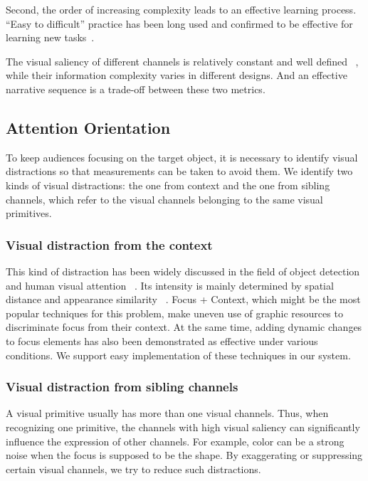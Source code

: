 Second, the order of increasing complexity leads to an effective learning process. “Easy to difficult” practice has been long used and confirmed to be effective for learning new tasks~\cite{bliss_effects_1992}.
 
The visual saliency of different channels is relatively constant and  well defined ~\cite{munzner_visualization_2014,cleveland_graphical_1984}, while their information complexity varies in different designs. And an effective narrative sequence is a trade-off between these two metrics. 


\subsection{Attention Orientation}
To keep audiences focusing on the target object, it is necessary to identify visual distractions so that measurements can be taken to avoid them. 
We identify two kinds of visual distractions: the one from context and the one from sibling channels, which refer to the visual channels belonging to the same visual primitives. 

\subsubsection{Visual distraction from the context}
This kind of distraction has been widely discussed in the field of object detection and human visual attention ~\cite{nothdurft_salience_2000, standage_modelling_2005}. Its intensity is mainly  determined by spatial distance and appearance similarity ~\cite{wolfe_guided_1994}. 
Focus + Context, which might be the most popular techniques for this problem, make uneven use of graphic resources to discriminate focus from their context. At the same time, adding dynamic changes to focus elements has also been demonstrated as effective under various conditions\cite{waldner_attractive_2014}. We support easy implementation of these techniques in our system. 

\subsubsection{Visual distraction from sibling channels}
A visual primitive usually has more than one visual channels. Thus, when recognizing one primitive, the channels with high visual saliency can significantly influence the expression of other channels. For example, color can be a strong noise when the focus is supposed to be the shape. By exaggerating or suppressing certain visual channels, we try to reduce such distractions.


